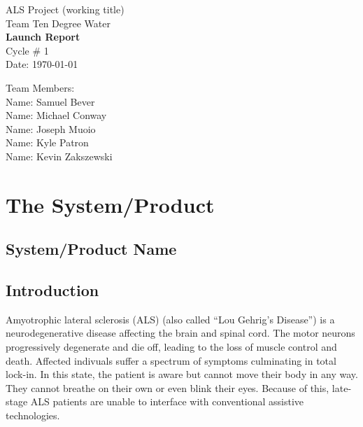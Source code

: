 \documentclass{report}
\begin{document}
\begin{titlepage}
    \begin{center}
        \begin{huge}
        ALS Project (working title) \\[1cm]
        Team Ten Degree Water \\[2.2cm]
        { \bfseries Launch Report } \\[1cm]
        Cycle \# 1\\[2.2cm]
        Date: \required\today\\[1cm]
        \end{huge}
    \end{center}
    \null \vfill
    \begin{large}
        Team Members: \\[0.5cm]
        Name: Samuel Bever\\[0.5cm]
        Name: Michael Conway\\[0.5cm]
        Name: Joseph Muoio\\[0.5cm]
        Name: Kyle Patron\\[0.5cm]
        Name: Kevin Zakszewski
    \end{large}
\end{titlepage}

\section*{\centering The System/Product}

\subsection*{System/Product Name}


\subsection*{Introduction}

Amyotrophic lateral sclerosis (ALS) (also called ``Lou Gehrig's Disease'') is
a neurodegenerative disease affecting the brain and spinal cord. The motor
neurons progressively degenerate and die off, leading to the loss of muscle
control and death. Affected indivuals suffer a spectrum of symptoms
culminating in total lock-in. In this state, the patient is aware but cannot
move their body in any way. They cannot breathe on their own or even blink
their eyes. Because of this, late-stage ALS patients are unable to interface
with conventional assistive technologies.\cite{ALSsource}
\end{document}
